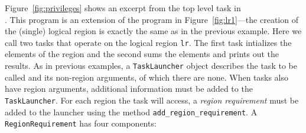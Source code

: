 Figure~\ref{fig:privileges} shows an excerpt from the top level task in \\
.  This program is an extension of the
program in Figure~\ref{fig:lr1}---the creation of the (single) logical region is exactly the same as in the 
previous example.  Here we call two tasks that operate on the logical region {\tt lr}. The first
task intializes the elements of the region and the second sums the elements and prints out the results.
As in previous examples, a {\tt TaskLauncher} object describes the task to be called and its non-region arguments,
of which there are none.  When tasks also have region arguments, additional information must be added
to the {\tt TaskLauncher}.
For each region the task will access, a {\em region requirement} must be added to the launcher using the
method {\tt add\_region\_requirement}.  A {\tt RegionRequirement} has four components: 

